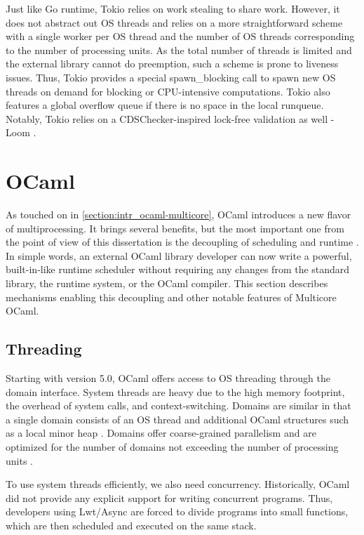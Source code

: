 \documentclass[12pt,a4paper,twoside]{report}
\begin{document}
Just like Go runtime, Tokio relies on work stealing to share work. However, it does not abstract out OS threads and relies on a more straightforward scheme with a single worker per OS thread and the number of OS threads corresponding to the number of processing units. As the total number of threads is limited and the external library cannot do preemption, such a scheme is prone to liveness issues. Thus, Tokio provides a special spawn\_blocking call to spawn new OS threads on demand for blocking or CPU-intensive computations. Tokio also features a global overflow queue if there is no space in the local runqueue. Notably, Tokio relies on a CDSChecker-inspired lock-free validation as well - Loom \cite{tokiorsl53:online}.

\section{OCaml}
\label{section:background_ocaml}

As touched on in \ref{section:intr_ocaml-multicore}, OCaml introduces a new flavor of multiprocessing. It brings several benefits, but the most important one from the point of view of this dissertation is the decoupling of scheduling and runtime \cite{stephen_effective_nodate}. In simple words, an external OCaml library developer can now write a powerful, built-in-like runtime scheduler without requiring any changes from the standard library, the runtime system, or the OCaml compiler. This section describes mechanisms enabling this decoupling and other notable features of Multicore OCaml.

\subsection{Threading}
\label{section:fibers}
Starting with version 5.0, OCaml offers access to OS threading through the domain interface. System threads are heavy due to the high memory footprint, the overhead of system calls, and context-switching. Domains are similar in that a single domain consists of an OS thread and additional OCaml structures such as a local minor heap \cite{Sivaramakrishnan2020}. Domains offer coarse-grained parallelism and are optimized for the number of domains not exceeding the number of processing units \cite{Concurre37:online}.

To use system threads efficiently, we also need concurrency. Historically, OCaml did not provide any explicit support for writing concurrent programs. Thus, developers using Lwt/Async are forced to divide programs into small functions, which are then scheduled and executed on the same stack. 
\end{document}
